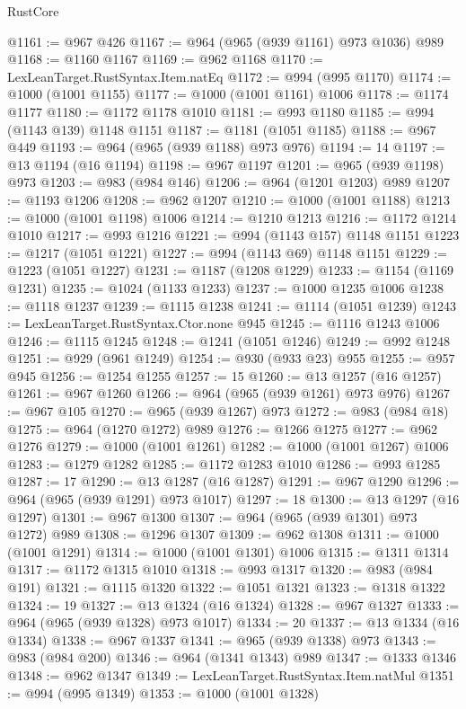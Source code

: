 \begin{lexlean}{RustCore}
\begin{coremodule}
@1161 := @967 @426
@1167 := @964 (@965 (@939 @1161) @973 @1036) @989
@1168 := @1160 @1167
@1169 := @962 @1168
@1170 := LexLeanTarget.RustSyntax.Item.natEq
@1172 := @994 (@995 @1170)
@1174 := @1000 (@1001 @1155)
@1177 := @1000 (@1001 @1161) @1006
@1178 := @1174 @1177
@1180 := @1172 @1178 @1010
@1181 := @993 @1180
@1185 := @994 (@1143 @139) @1148 @1151
@1187 := @1181 (@1051 @1185)
@1188 := @967 @449
@1193 := @964 (@965 (@939 @1188) @973 @976)
@1194 := 14
@1197 := @13 @1194 (@16 @1194)
@1198 := @967 @1197
@1201 := @965 (@939 @1198) @973
@1203 := @983 (@984 @146)
@1206 := @964 (@1201 @1203) @989
@1207 := @1193 @1206
@1208 := @962 @1207
@1210 := @1000 (@1001 @1188)
@1213 := @1000 (@1001 @1198) @1006
@1214 := @1210 @1213
@1216 := @1172 @1214 @1010
@1217 := @993 @1216
@1221 := @994 (@1143 @157) @1148 @1151
@1223 := @1217 (@1051 @1221)
@1227 := @994 (@1143 @69) @1148 @1151
@1229 := @1223 (@1051 @1227)
@1231 := @1187 (@1208 @1229)
@1233 := @1154 (@1169 @1231)
@1235 := @1024 (@1133 @1233)
@1237 := @1000 @1235 @1006
@1238 := @1118 @1237
@1239 := @1115 @1238
@1241 := @1114 (@1051 @1239)
@1243 := LexLeanTarget.RustSyntax.Ctor.none @945
@1245 := @1116 @1243 @1006
@1246 := @1115 @1245
@1248 := @1241 (@1051 @1246)
@1249 := @992 @1248
@1251 := @929 (@961 @1249)
@1254 := @930 (@933 @23) @955
@1255 := @957 @945
@1256 := @1254 @1255
@1257 := 15
@1260 := @13 @1257 (@16 @1257)
@1261 := @967 @1260
@1266 := @964 (@965 (@939 @1261) @973 @976)
@1267 := @967 @105
@1270 := @965 (@939 @1267) @973
@1272 := @983 (@984 @18)
@1275 := @964 (@1270 @1272) @989
@1276 := @1266 @1275
@1277 := @962 @1276
@1279 := @1000 (@1001 @1261)
@1282 := @1000 (@1001 @1267) @1006
@1283 := @1279 @1282
@1285 := @1172 @1283 @1010
@1286 := @993 @1285
@1287 := 17
@1290 := @13 @1287 (@16 @1287)
@1291 := @967 @1290
@1296 := @964 (@965 (@939 @1291) @973 @1017)
@1297 := 18
@1300 := @13 @1297 (@16 @1297)
@1301 := @967 @1300
@1307 := @964 (@965 (@939 @1301) @973 @1272) @989
@1308 := @1296 @1307
@1309 := @962 @1308
@1311 := @1000 (@1001 @1291)
@1314 := @1000 (@1001 @1301) @1006
@1315 := @1311 @1314
@1317 := @1172 @1315 @1010
@1318 := @993 @1317
@1320 := @983 (@984 @191)
@1321 := @1115 @1320
@1322 := @1051 @1321
@1323 := @1318 @1322
@1324 := 19
@1327 := @13 @1324 (@16 @1324)
@1328 := @967 @1327
@1333 := @964 (@965 (@939 @1328) @973 @1017)
@1334 := 20
@1337 := @13 @1334 (@16 @1334)
@1338 := @967 @1337
@1341 := @965 (@939 @1338) @973
@1343 := @983 (@984 @200)
@1346 := @964 (@1341 @1343) @989
@1347 := @1333 @1346
@1348 := @962 @1347
@1349 := LexLeanTarget.RustSyntax.Item.natMul
@1351 := @994 (@995 @1349)
@1353 := @1000 (@1001 @1328)

\end{coremodule}
\end{lexlean}

